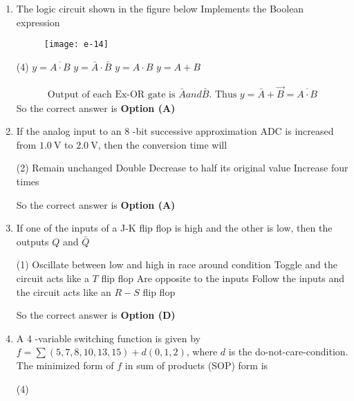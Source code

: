\begin{enumerate}
	\item  The logic circuit shown in the figure below Implements the Boolean expression
	{}
\begin{figure}[H]
\centering
\texttt{[image: e-14]}
\end{figure}
\begin{tasks}(4)
\task[\textbf{A.}] $y=\overline{A \cdot B}$
\task[\textbf{B.}] $y=\bar{A} \cdot \bar{B}$
\task[\textbf{C.}] $y=A \cdot B$
\task[\textbf{D.}] $y=A+B$
\end{tasks}
\begin{answer}
\begin{align*}
\text{Output of each Ex-OR gate is }\bar{A} and \bar{B}.\text{ Thus }y=\bar{A}+\vec{B}=\overline{A \cdot B}
\end{align*}
So the correct answer is \textbf{Option (A)}
\end{answer}
	\item If the analog input to an 8 -bit successive approximation ADC is increased from $1.0 \mathrm{~V}$ to $2.0 \mathrm{~V}$, then the conversion time will
	{}
\begin{tasks}(2)
\task[\textbf{A.}] Remain unchanged
\task[\textbf{B.}] Double
\task[\textbf{C.}] Decrease to half its original value
\task[\textbf{D.}] Increase four times
\end{tasks}
\begin{answer}
So the correct answer is \textbf{Option (A)}
\end{answer}
	\item If one of the inputs of a J-K flip flop is high and the other is low, then the outputs $Q$ and $\bar{Q}$
{	}
\begin{tasks}(1)
\task[\textbf{A.}] Oscillate between low and high in race around condition
\task[\textbf{B.}] Toggle and the circuit acts like a $T$ flip flop
\task[\textbf{C.}] Are opposite to the inputs
\task[\textbf{D.}] Follow the inputs and the circuit acts like an $R-S$ flip flop
\end{tasks}
\begin{answer}
So the correct answer is \textbf{Option (D)}
\end{answer}
	\item A 4 -variable switching function is given by $f=\sum(5,7,8,10,13,15)+d(0,1,2)$, where $d$ is the do-not-care-condition. The minimized form of $f$ in sum of products (SOP) form is
	{}
\begin{tasks}(4)

\end{tasks}
\end{enumerate}
